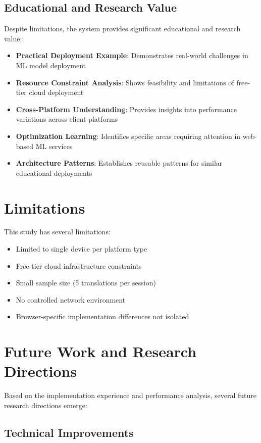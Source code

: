 \documentclass[conference]{IEEEtran}
\begin{document}
\subsection{Educational and Research Value}

Despite limitations, the system provides significant educational and research value:

\begin{itemize}
    \item \textbf{Practical Deployment Example}: Demonstrates real-world challenges in ML model deployment
    \item \textbf{Resource Constraint Analysis}: Shows feasibility and limitations of free-tier cloud deployment
    \item \textbf{Cross-Platform Understanding}: Provides insights into performance variations across client platforms
    \item \textbf{Optimization Learning}: Identifies specific areas requiring attention in web-based ML services
    \item \textbf{Architecture Patterns}: Establishes reusable patterns for similar educational deployments
\end{itemize}

\section{Limitations}

This study has several limitations:
\begin{itemize}
    \item Limited to single device per platform type
    \item Free-tier cloud infrastructure constraints
    \item Small sample size (5 translations per session)
    \item No controlled network environment
    \item Browser-specific implementation differences not isolated
\end{itemize}

\section{Future Work and Research Directions}

Based on the implementation experience and performance analysis, several future research directions emerge:

\subsection{Technical Improvements}
\end{document}
